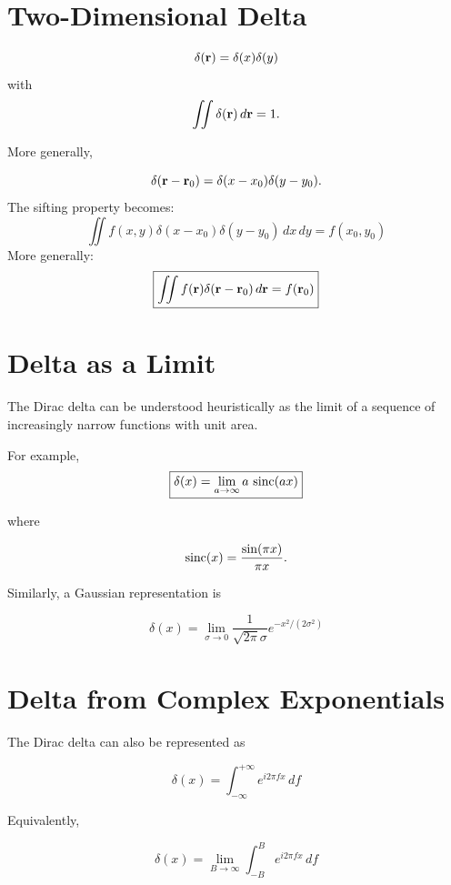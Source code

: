 

\section{Two-Dimensional Delta}
%
\[
\delta(\mathbf{r})
=
\delta(x)\delta(y)
\]
with
\[
\iint
\delta(\mathbf{r})\,d\mathbf{r}
=
1.
\]

More generally,

\[
\delta(\mathbf{r}-\mathbf{r}_0)
=
\delta(x-x_0)\delta(y-y_0).
\]
The sifting property becomes:
\[
\boxed{
\iint
f(x,y)
\delta(x-x_0)
\delta(y-y_0)
\,dx\,dy
=
f(x_0,y_0)
}
\]
More generally:
\[
\boxed{
\iint
f(\mathbf{r})
\delta(\mathbf{r}-\mathbf{r}_0)
\,d\mathbf{r}
=
f(\mathbf{r}_0)
}
\]


\section{Delta as a Limit}

The Dirac delta can be understood heuristically as the limit of a sequence
of increasingly narrow functions with unit area.

For example,
\[
\boxed{
\delta(x)
=
\lim_{a\rightarrow\infty}
a\,\operatorname{sinc}(ax)
}
\]

where

\[
\operatorname{sinc}(x)=\frac{\sin(\pi x)}{\pi x}.
\]



Similarly, a Gaussian representation is

\[
\boxed{
\delta(x)
=
\lim_{\sigma\rightarrow0}
\frac{1}{\sqrt{2\pi}\sigma}
e^{-x^2/(2\sigma^2)}
}
\]

\section{Delta from Complex Exponentials}

The Dirac delta can also be represented as

\[
\boxed{
\delta(x)
=
\int_{-\infty}^{+\infty}
e^{i2\pi f x}\,df
}
\]

Equivalently,

\[
\boxed{
\delta(x)
=
\lim_{B\rightarrow\infty}
\int_{-B}^{B}
e^{i2\pi f x}\,df
}
\]

